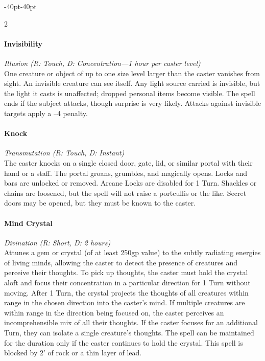 \documentclass{book}
\begin{document}
\begin{adjustwidth}{-40pt}{-40pt}
\begin{multicols}{2}
\paragraph{Invisibility}\label{invisibility}

\emph{Illusion (R: Touch, D: Concentration---1 hour per caster level)}\\
One creature or object of up to one size level larger than the caster
vanishes from sight. An invisible creature can see itself. Any light
source carried is invisible, but the light it casts is unaffected;
dropped personal items become visible. The spell ends if the subject
attacks, though surprise is very likely. Attacks against invisible
targets apply a --4 penalty.

\paragraph{Knock}\label{knock}

\emph{Transmutation (R: Touch, D: Instant)}\\
The caster knocks on a single closed door, gate, lid, or similar portal
with their hand or a staff. The portal groans, grumbles, and magically
opens. Locks and bars are unlocked or removed. Arcane Locks are disabled
for 1 Turn. Shackles or chains are loosened, but the spell will not
raise a portcullis or the like. Secret doors may be opened, but they
must be known to the caster.

\paragraph{Mind Crystal}\label{mind-crystal}

\emph{Divination (R: Short, D: 2 hours)}\\
Attunes a gem or crystal (of at least 250gp value) to the subtly
radiating energies of living minds, allowing the caster to detect the
presence of creatures and perceive their thoughts. To pick up thoughts,
the caster must hold the crystal aloft and focus their concentration in
a particular direction for 1 Turn without moving. After 1 Turn, the
crystal projects the thoughts of all creatures within range in the
chosen direction into the caster's mind. If multiple creatures are
within range in the direction being focused on, the caster perceives an
incomprehensible mix of all their thoughts. If the caster focuses for an
additional Turn, they can isolate a single creature's thoughts. The
spell can be maintained for the duration only if the caster continues to
hold the crystal. This spell is blocked by 2' of rock or a thin layer of
lead.


\end{multicols}
\end{adjustwidth}
\end{document}
